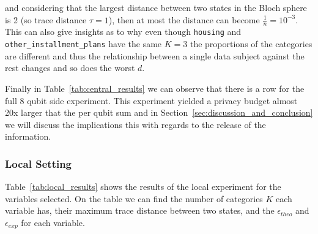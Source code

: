 \documentclass{ieeeaccess}
\begin{document}
and considering that the largest distance between two states in the Bloch sphere is 2 (so trace distance $\tau =1$), then at most the distance can become $\frac{1}{n} = 10^{-3}$. This can also give insights as to why even though \texttt{housing} and \texttt{other\_installment\_plans} have the same $K=3$ the proportions of the categories are different and thus the relationship between a single data subject against the rest changes and so does the worst $d$.

Finally in Table~\ref{tab:central_results} we can observe that there is a row for the full 8 qubit side experiment. This experiment yielded a privacy budget almost 20x larger that the per qubit sum and in Section~\ref{sec:discussion_and_conclusion} we will discuss the implications this with regards to the release of the information.

\subsubsection{Local Setting}

Table~\ref{tab:local_results} shows the results of the local experiment for the variables selected. On the table we can find the number of categories $K$ each variable has, their maximum trace distance between two states, and the $\epsilon_{theo}$ and $\epsilon_{exp}$ for each variable.
\end{document}
